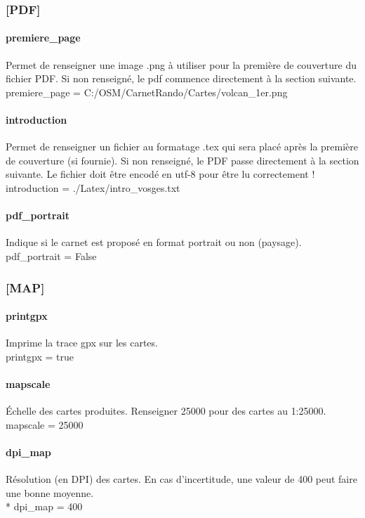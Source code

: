 \documentclass[12pt,french]{article}
\begin{document}
\subsubsection{[PDF]}
\paragraph{premiere\_page} Permet de renseigner une image .png à utiliser pour la première de couverture du fichier PDF. Si non renseigné, le pdf commence directement à la section suivante. \\
premiere\_page = C:/OSM/CarnetRando/Cartes/volcan\_1er.png
\paragraph{introduction} Permet de renseigner un fichier au formatage .tex qui sera placé après la première de couverture (si fournie). Si non renseigné, le PDF passe directement à la section suivante. Le fichier doit être encodé en utf-8 pour être lu correctement !\\
introduction = ./Latex/intro\_vosges.txt
\paragraph{pdf\_portrait} Indique si le carnet est proposé en format portrait ou non (paysage).\\
pdf\_portrait = False

\subsubsection{[MAP]}
\paragraph{printgpx} Imprime la trace gpx sur les cartes.\\
printgpx = true
\paragraph{mapscale} Échelle des cartes produites. Renseigner 25000 pour des cartes au {\shorthandoff{:}1:25000}.\\
mapscale = 25000
\paragraph{dpi\_map} Résolution (en DPI) des cartes. En cas d'incertitude, une valeur de 400 peut faire une bonne moyenne.\\*
dpi\_map = 400
\end{document}

